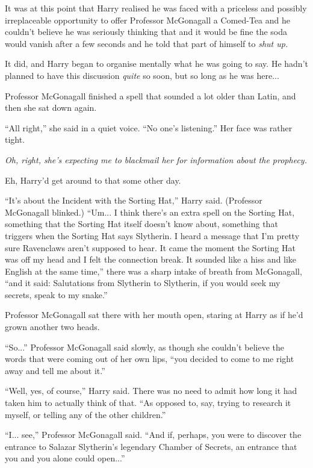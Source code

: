 It was at this point that Harry realised he was faced with a priceless
and possibly irreplaceable opportunity to offer Professor McGonagall a
Comed-Tea and he couldn't believe he was seriously thinking that and it
would be fine the soda would vanish after a few seconds and he told that
part of himself to \emph{shut up.}

It did, and Harry began to organise mentally what he was going to say.
He hadn't planned to have this discussion \emph{quite} so soon, but so
long as he was here...

Professor McGonagall finished a spell that sounded a lot older than
Latin, and then she sat down again.

``All right,'' she said in a quiet voice. ``No one's listening.'' Her
face was rather tight.

\emph{Oh, right, she's expecting me to blackmail her for information
about the prophecy.}

Eh, Harry'd get around to that some other day.

``It's about the Incident with the Sorting Hat,'' Harry said. (Professor
McGonagall blinked.) ``Um... I think there's an extra spell on the
Sorting Hat, something that the Sorting Hat itself doesn't know about,
something that triggers when the Sorting Hat says Slytherin. I heard a
message that I'm pretty sure Ravenclaws aren't supposed to hear. It came
the moment the Sorting Hat was off my head and I felt the connection
break. It sounded like a hiss and like English at the same time,'' there
was a sharp intake of breath from McGonagall, ``and it said: Salutations
from Slytherin to Slytherin, if you would seek my secrets, speak to my
snake.''

Professor McGonagall sat there with her mouth open, staring at Harry as
if he'd grown another two heads.

``So...'' Professor McGonagall said slowly, as though she couldn't
believe the words that were coming out of her own lips, ``you decided to
come to me right away and tell me about it.''

``Well, yes, of course,'' Harry said. There was no need to admit how
long it had taken him to actually think of that. ``As opposed to, say,
trying to research it myself, or telling any of the other children.''

``I... see,'' Professor McGonagall said. ``And if, perhaps, you
were to discover the entrance to Salazar Slytherin's legendary Chamber
of Secrets, an entrance that you and you alone could open...''

